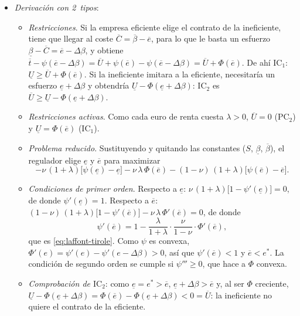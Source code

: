 \documentclass[11pt]{article}
\begin{document}
\begin{itemize}
\item \emph{Derivación con 2~tipos}:
\begin{itemize}
\item \emph{Restricciones}. Si la empresa eficiente elige el contrato de la ineficiente, tiene que llegar al coste $\overline{C}=\overline{\beta}-\overline{e}$, para lo que le basta un esfuerzo $\underline{\beta}-\overline{C}=\overline{e}-\Delta\beta$, y obtiene $\overline{t}-\psi(\overline{e}-\Delta\beta)=\overline{U}+\psi(\overline{e})-\psi(\overline{e}-\Delta\beta)=\overline{U}+\Phi(\overline{e})$. De ahí $\mathrm{IC}_1$: $\underline{U}\geq\overline{U}+\Phi(\overline{e})$. Si la ineficiente imitara a la eficiente, necesitaría un esfuerzo $\underline{e}+\Delta\beta$ y obtendría $\underline{U}-\Phi(\underline{e}+\Delta\beta)$: $\mathrm{IC}_2$ es $\overline{U}\geq\underline{U}-\Phi(\underline{e}+\Delta\beta)$.
\item \emph{Restricciones activas}. Como cada euro de renta cuesta $\lambda>0$, $\overline{U}=0$ ($\mathrm{PC}_2$) y $\underline{U}=\Phi(\overline{e})$ ($\mathrm{IC}_1$).
\item \emph{Problema reducido}. Sustituyendo y quitando las constantes ($S$, $\underline{\beta}$, $\overline{\beta}$), el regulador elige $\underline{e}$ y $\overline{e}$ para maximizar
  \[
  -\nu\,(1+\lambda)\big[\psi(\underline{e})-\underline{e}\big]-\nu\,\lambda\,\Phi(\overline{e})-(1-\nu)\,(1+\lambda)\big[\psi(\overline{e})-\overline{e}\big].
  \]
\item \emph{Condiciones de primer orden}. Respecto a $\underline{e}$: $\nu\,(1+\lambda)\big[1-\psi'(\underline{e})\big]=0$, de donde $\psi'(\underline{e})=1$. Respecto a $\overline{e}$: $(1-\nu)\,(1+\lambda)\big[1-\psi'(\overline{e})\big]-\nu\,\lambda\,\Phi'(\overline{e})=0$, de donde
  \[
  \psi'(\overline{e})=1-\frac{\lambda}{1+\lambda}\cdot\frac{\nu}{1-\nu}\cdot\Phi'(\overline{e}),
  \]
  que es \eqref{eq:laffont-tirole}. Como $\psi$ es convexa, $\Phi'(e)=\psi'(e)-\psi'(e-\Delta\beta)>0$, así que $\psi'(\overline{e})<1$ y $\overline{e}<e^{*}$. La condición de segundo orden se cumple si $\psi'''\geq 0$, que hace a $\Phi$ convexa.
\item \emph{Comprobación de $\mathrm{IC}_2$}: como $\underline{e}=e^{*}>\overline{e}$, $\underline{e}+\Delta\beta>\overline{e}$ y, al ser $\Phi$ creciente, $\underline{U}-\Phi(\underline{e}+\Delta\beta)=\Phi(\overline{e})-\Phi(\underline{e}+\Delta\beta)<0=\overline{U}$: la ineficiente no quiere el contrato de la eficiente.\findemo

\end{itemize}
\end{itemize}
\end{document}
